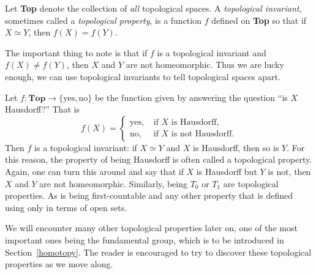 \begin{defn}
  Let \textbf{Top} denote the collection of \emph{all} topological spaces. A \emph{topological invariant}, sometimes called a \emph{topological property}, is a function $f$ defined on \textbf{Top} so that if $X \simeq Y$, then $f(X) = f(Y)$.
\end{defn}
The important thing to note is that if $f$ is a topological invariant and $f(X) \not= f(Y)$, then $X$ and $Y$ are not homeomorphic. Thus we are lucky enough, we can use topological invariants to tell topological spaces apart.
\begin{example}
  Let $f : \textbf{Top} \to \{ \text{yes}, \text{no} \}$ be the function given by answering the question ``is $X$ Hausdorff?'' That is
  \[
    f(X) = \begin{cases} \text{yes}, &\text{ if $X$ is Hausdorff,}\\ \text{no}, &\text{ if $X$ is not Hausdorff.} \end{cases}
  \]
  Then $f$ is a topological invariant: if $X \simeq Y$ and $X$ is Hausdorff, then so is $Y$. For this reason, the property of being Hausdorff is often called a topological property. Again, one can turn this around and say that if $X$ is Hausdorff but $Y$ is not, then $X$ and $Y$ are not homeomorphic. Similarly, being $T_0$ or $T_1$ are topological properties. As is being first-countable and any other property that is defined using only in terms of open sets.
\end{example}

We will encounter many other topological properties later on, one of the most important ones being the fundamental group, which is to be introduced in Section~\ref{homotopy}. The reader is encouraged to try to discover these topological properties as we move along.

